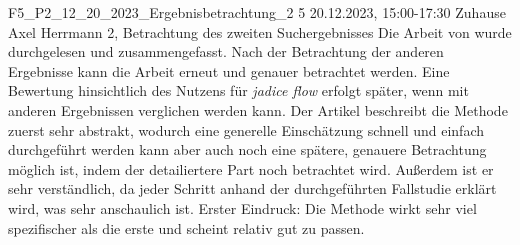 \fieldnote
{F5\_P2\_12\_20\_2023\_Ergebnisbetrachtung\_2}
{5}
{20.12.2023, 15:00-17:30}
{Zuhause}
{Axel Herrmann}
{2, Betrachtung des zweiten Suchergebnisses}
{
	Die Arbeit von  wurde durchgelesen und zusammengefasst.
}
{
	Nach der Betrachtung der anderen Ergebnisse kann die Arbeit erneut und genauer betrachtet werden.
	Eine Bewertung hinsichtlich des Nutzens für \emph{jadice flow} erfolgt später, wenn mit anderen Ergebnissen verglichen werden kann.
}
{
	Der Artikel beschreibt die Methode zuerst sehr abstrakt, wodurch eine generelle Einschätzung schnell und einfach durchgeführt werden kann aber auch noch eine spätere, genauere Betrachtung möglich ist, indem der detailiertere Part noch betrachtet wird.
	Außerdem ist er sehr verständlich, da jeder Schritt anhand der durchgeführten Fallstudie erklärt wird, was sehr anschaulich ist.
}
{}
{
	Erster Eindruck: Die Methode wirkt sehr viel spezifischer als die erste und scheint relativ gut zu passen.
}
